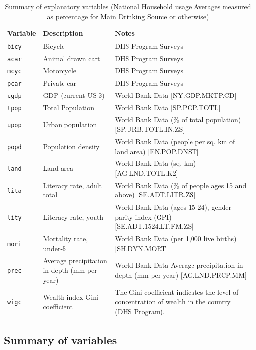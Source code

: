 \documentclass[10pt,twoside]{article}
\numberwithin{equation}{section}
\newcommand{\?}{\stackrel{?}{=}}
\begin{document}
\begin{table}[h!]
  \centering
  \begin{tabular}{p{1in} p{3in} p{2in}}\toprule
    \bf Variable & \bf Description & \bf Notes \\\midrule
 \texttt{bicy} & Bicycle
 & DHS Program Surveys
\\\midrule
 \texttt{acar} & Animal drawn cart
 & DHS Program Surveys
\\\midrule
 \texttt{mcyc} & Motorcycle
 & DHS Program Surveys
\\\midrule
 \texttt{pcar} & Private car
 & DHS Program Surveys
\\\midrule
 \texttt{cgdp} & GDP (current US \$) 
 & World Bank Data [NY.GDP.MKTP.CD]
\\\midrule
 \texttt{tpop} & Total Population
 & World Bank Data   [SP.POP.TOTL]
\\\midrule
 \texttt{upop} & Urban population 
 & World Bank Data  (\% of total population)  [SP.URB.TOTL.IN.ZS]
\\\midrule
 \texttt{popd} & Population density 
 & World Bank Data  (people per sq. km of land area)  [EN.POP.DNST]
\\\midrule
 \texttt{land} & Land area 
 & World Bank Data  (sq. km) [AG.LND.TOTL.K2]
\\\midrule
 \texttt{lita} & Literacy rate, adult total 
 & World Bank Data  (\% of people ages 15 and above) [SE.ADT.LITR.ZS]
\\\midrule
 \texttt{lity} & Literacy rate, youth 
 & World Bank Data  (ages 15-24), gender parity index (GPI) [SE.ADT.1524.LT.FM.ZS]
\\\midrule
 \texttt{mori} & Mortality rate, under-5 
 & World Bank Data  (per 1,000 live births) [SH.DYN.MORT]
\\\midrule
 \texttt{prec} & Average precipitation in depth (mm per year)
 & World Bank Data  Average precipitation in depth (mm per year)
 [AG.LND.PRCP.MM]
\\\midrule
 \texttt{wigc} & Wealth index Gini coefficient
 & The Gini coefficient indicates the level of concentration of wealth in the country (DHS Program).
 
  \\\bottomrule
  \end{tabular}
  \caption{Summary of explanatory variables (National Household usage Averages measured as percentage for Main Drinking Source or otherwise) }
  \label{tab:summary-var}
\end{table}

 \subsection*{Summary of variables}
\end{document}
